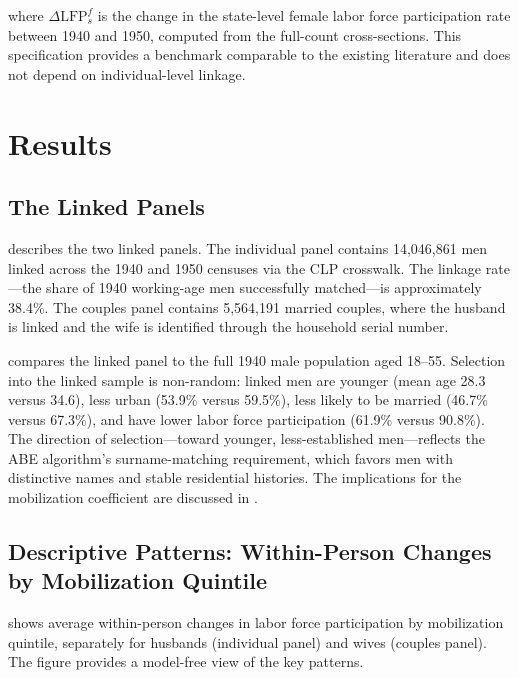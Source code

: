 \documentclass[12pt]{article}
\begin{document}
\noindent where $\Delta \text{LFP}^f_s$ is the change in the state-level female labor force participation rate between 1940 and 1950, computed from the full-count cross-sections. This specification provides a benchmark comparable to the existing literature and does not depend on individual-level linkage.



\section{Results}
\label{sec:results}

\subsection{The Linked Panels}

 describes the two linked panels. The individual panel contains 14,046,861 men linked across the 1940 and 1950 censuses via the CLP crosswalk. The linkage rate---the share of 1940 working-age men successfully matched---is approximately 38.4\%. The couples panel contains 5,564,191 married couples, where the husband is linked and the wife is identified through the household serial number.

 compares the linked panel to the full 1940 male population aged 18--55. Selection into the linked sample is non-random: linked men are younger (mean age 28.3 versus 34.6), less urban (53.9\% versus 59.5\%), less likely to be married (46.7\% versus 67.3\%), and have lower labor force participation (61.9\% versus 90.8\%). The direction of selection---toward younger, less-established men---reflects the ABE algorithm's surname-matching requirement, which favors men with distinctive names and stable residential histories. The implications for the mobilization coefficient are discussed in .

\subsection{Descriptive Patterns: Within-Person Changes by Mobilization Quintile}

 shows average within-person changes in labor force participation by mobilization quintile, separately for husbands (individual panel) and wives (couples panel). The figure provides a model-free view of the key patterns.
\end{document}
